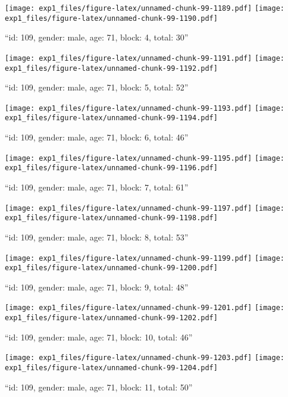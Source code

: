 \documentclass[,]{article}
\begin{document}
\texttt{[image: exp1\_files/figure-latex/unnamed-chunk-99-1189.pdf]}
\texttt{[image: exp1\_files/figure-latex/unnamed-chunk-99-1190.pdf]}

\newpage
[1] 

``id: 109, gender: male, age: 71, block: 4, total: 30''

\texttt{[image: exp1\_files/figure-latex/unnamed-chunk-99-1191.pdf]}
\texttt{[image: exp1\_files/figure-latex/unnamed-chunk-99-1192.pdf]}

\newpage
[1] 

``id: 109, gender: male, age: 71, block: 5, total: 52''

\texttt{[image: exp1\_files/figure-latex/unnamed-chunk-99-1193.pdf]}
\texttt{[image: exp1\_files/figure-latex/unnamed-chunk-99-1194.pdf]}

\newpage
[1] 

``id: 109, gender: male, age: 71, block: 6, total: 46''

\texttt{[image: exp1\_files/figure-latex/unnamed-chunk-99-1195.pdf]}
\texttt{[image: exp1\_files/figure-latex/unnamed-chunk-99-1196.pdf]}

\newpage
[1] 

``id: 109, gender: male, age: 71, block: 7, total: 61''

\texttt{[image: exp1\_files/figure-latex/unnamed-chunk-99-1197.pdf]}
\texttt{[image: exp1\_files/figure-latex/unnamed-chunk-99-1198.pdf]}

\newpage
[1] 

``id: 109, gender: male, age: 71, block: 8, total: 53''

\texttt{[image: exp1\_files/figure-latex/unnamed-chunk-99-1199.pdf]}
\texttt{[image: exp1\_files/figure-latex/unnamed-chunk-99-1200.pdf]}

\newpage
[1] 

``id: 109, gender: male, age: 71, block: 9, total: 48''

\texttt{[image: exp1\_files/figure-latex/unnamed-chunk-99-1201.pdf]}
\texttt{[image: exp1\_files/figure-latex/unnamed-chunk-99-1202.pdf]}

\newpage
[1] 

``id: 109, gender: male, age: 71, block: 10, total: 46''

\texttt{[image: exp1\_files/figure-latex/unnamed-chunk-99-1203.pdf]}
\texttt{[image: exp1\_files/figure-latex/unnamed-chunk-99-1204.pdf]}

\newpage
[1] 

``id: 109, gender: male, age: 71, block: 11, total: 50''
\end{document}
